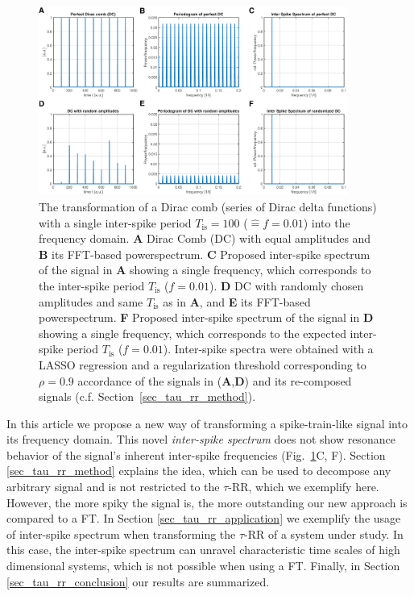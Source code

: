 \documentclass[entropy,article,submit,pdftex,moreauthors]{Definitions/mdpi}
\begin{document}
\begin{figure}[h]
 \centering
 \includegraphics[width=0.9\textwidth]{./figures/fig_tau_rr_dirac_comb}
 \caption{The transformation of a Dirac comb (series of Dirac delta functions) with a single inter-spike period $T_{\text{is}}=100$ ($\widehat{=}f=0.01$) 
 into the frequency domain. 
 \textbf{A} Dirac Comb (DC) with equal amplitudes and
 \textbf{B} its FFT-based powerspectrum.
 \textbf{C} Proposed inter-spike spectrum of the signal in \textbf{A} showing a single frequency, which corresponds to the inter-spike period $T_{\text{is}}$ ($f=0.01$).
 \textbf{D} DC with randomly chosen amplitudes and same $T_{\text{is}}$ as in \textbf{A}, and
 \textbf{E} its FFT-based powerspectrum. 
 \textbf{F} Proposed inter-spike spectrum of the signal in \textbf{D} showing a single frequency, which corresponds to the expected inter-spike period $T_{\text{is}}$ ($f=0.01$). 
 Inter-spike spectra were obtained with a LASSO regression and a regularization threshold corresponding to $\rho=0.9$ accordance of the signals in (\textbf{A},\textbf{D}) and 
 its re-composed signals (c.f. Section~\ref{sec_tau_rr_method}). 
}
\label{fig_tau_rr_dirac_comb}
\end{figure}

In this article we propose a new way of transforming a spike-train-like signal into its frequency domain. This novel \textit{inter-spike spectrum} does not show resonance 
behavior of the signal's inherent inter-spike frequencies (Fig.~\ref{fig_tau_rr_dirac_comb}C, F). Section \ref{sec_tau_rr_method} explains the idea, which can be used to decompose 
any arbitrary signal and is not restricted to the $\tau$-RR, which we exemplify here. However, the more spiky the signal is, the more outstanding our new approach is compared to a 
FT. In Section \ref{sec_tau_rr_application} we exemplify the usage of inter-spike spectrum when transforming the $\tau$-RR of a system under study. In this case, the inter-spike spectrum 
can unravel characteristic time scales of high dimensional systems, which is not possible when using a FT. Finally, in Section \ref{sec_tau_rr_conclusion} our results are summarized.
\end{document}
